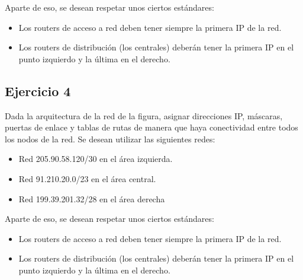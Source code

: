 \documentclass[letterpaper,10pt,spanish]{sphinxmanual}
\begin{document}
\begin{figure}[htbp]
\centering

\noindent{}
\end{figure}

\sphinxAtStartPar
Aparte de eso, se desean respetar unos ciertos estándares:
\begin{itemize}
\item {} 
\sphinxAtStartPar
Los routers de acceso a red deben tener siempre la primera IP de la red.

\item {} 
\sphinxAtStartPar
Los routers de distribución (los centrales) deberán tener la primera IP en el punto izquierdo y la última en el derecho.

\end{itemize}


\subsection{Ejercicio 4}
\label{\detokenize{t2_integracion_elementos/ejercicios_subredes_ipv4/ejercicios_dos_router:ejercicio-4}}
\sphinxAtStartPar
Dada la arquitectura de la red de la figura, asignar direcciones IP, máscaras, puertas de enlace y tablas de rutas de manera que haya conectividad entre todos
los nodos de la red. Se desean utilizar las siguientes redes:
\begin{itemize}
\item {} 
\sphinxAtStartPar
Red 205.90.58.120/30 en el área izquierda.

\item {} 
\sphinxAtStartPar
Red 91.210.20.0/23 en el área central.

\item {} 
\sphinxAtStartPar
Red 199.39.201.32/28 en el área derecha

\end{itemize}

\begin{figure}[htbp]
\centering

\noindent{}
\end{figure}

\sphinxAtStartPar
Aparte de eso, se desean respetar unos ciertos estándares:
\begin{itemize}
\item {} 
\sphinxAtStartPar
Los routers de acceso a red deben tener siempre la primera IP de la red.

\item {} 
\sphinxAtStartPar
Los routers de distribución (los centrales) deberán tener la primera IP en el punto izquierdo y la última en el derecho.

\end{itemize}
\end{document}
